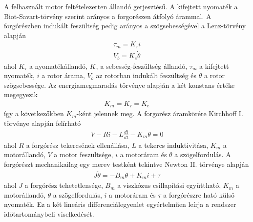 A felhasznált motor feltételezetten állandó gerjesztésű. A kifejtett nyomaték 
a Biot-Savart-törvény szerint arányos a forgorészen átfolyó árammal. A forgórészben
indukált feszültség pedig arányos a szögsebességével a Lenz-törvény alapján 
\begin{align}
    \tau_m = K_\tau i \\
    V_b = K_e \dot\theta
\end{align}
ahol $K_\tau$ a nyomatékállandó, $K_e$ a sebesség-feszültség állandó, $\tau_m$ a kifejtett 
nyomaték, $i$ a rotor árama, $V_b$ az rotorban indukált feszültség és $\dot\theta$ a rotor szögsebessége.
Az energiamegmaradás törvénye alapján a két konstans értéke megegyezik
\begin{align}
    K_m = K_\tau = K_e
\end{align}
így a következőkben $K_m$-ként jelennek meg. A forgorész áramkörére Kirchhoff I. törvénye alapján felírható
\begin{align}\label{eq:armature_circuit}
    V - Ri - L\frac{di}{dt} - K_m\dot\theta = 0
\end{align}
ahol $R$ a forgórész tekercsének ellenállása, $L$ a tekercs induktivitása, 
$K_m$ a motorállandó, $V$ a motor feszültsége, $i$ a motoráram és $\theta$ a szögelfordulás.
A forgórészt mechanikailag egy merev testként tekintve Newton II. törvénye alapján
\begin{align}\label{eq:rotor_dynamics}
    J\ddot\theta = -B_m\dot\theta + K_m i + \tau
\end{align}
ahol $J$ a forgórész tehetetlensége, $B_m$ a viszkózus csillapítási együttható, 
$K_m$ a motorállandó, $\theta$ a szögelfordulás, $i$ a motoráram és $\tau$ a forgórészre
ható külső nyomaték. Ez a két lineáris differenciálegyenlet egyértelműen leírja a 
rendszer időtartománybeli viselkedését.

